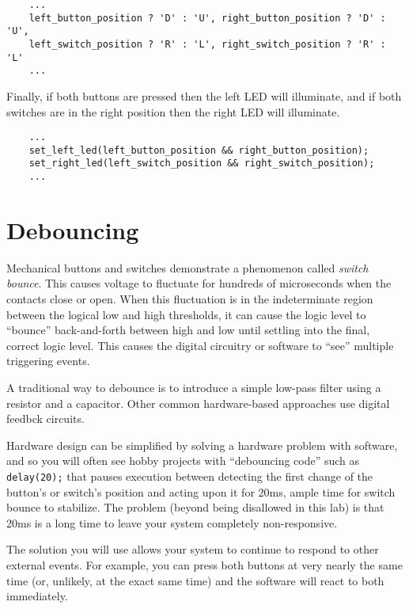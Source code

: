 \begin{lstlisting}
    ...
    left_button_position ? 'D' : 'U', right_button_position ? 'D' : 'U',
    left_switch_position ? 'R' : 'L', right_switch_position ? 'R' : 'L'
    ...
\end{lstlisting}

Finally, if both buttons are pressed then the left LED will illuminate, and if both switches are in the right position then the right LED will illuminate.

\begin{lstlisting}
    ...
    set_left_led(left_button_position && right_button_position);
    set_right_led(left_switch_position && right_switch_position);
    ...
\end{lstlisting}


\section{Debouncing} \label{sec:debouncing}

Mechanical buttons and switches demonstrate a phenomenon called \textit{switch bounce}.
This causes voltage to fluctuate for hundreds of microseconds when the contacts close or open.
When this fluctuation is in the indeterminate region between the logical low and high thresholds, it can cause the logic level to ``bounce'' back-and-forth between high and low until settling into the final, correct logic level.
This causes the digital circuitry or software to ``see'' multiple triggering events.

A traditional way to debounce is to introduce a simple low-pass filter using a resistor and a capacitor.
Other common hardware-based approaches use digital feedbck circuits.

Hardware design can be simplified by solving a hardware problem with software, and so you will often see hobby projects with ``debouncing code'' such as \lstinline{delay(20);} that pauses execution between detecting the first change of the button's or switch's position and acting upon it for 20ms, ample time for switch bounce to stabilize. The problem (beyond  being disallowed in this lab) is that 20ms is a long time to leave your system completely non-responsive.

The solution you will use allows your system to continue to respond to other external events. For example, you can press both buttons at very nearly the same time (or, unlikely, at the exact same time) and the software will react to both immediately.

